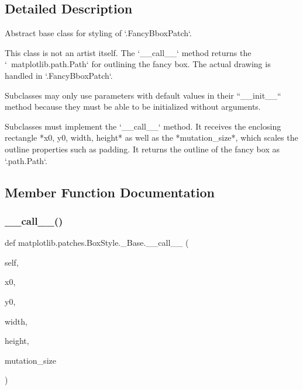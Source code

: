 \subsection{Detailed Description}
\begin{DoxyVerb}Abstract base class for styling of `.FancyBboxPatch`.

This class is not an artist itself.  The `__call__` method returns the
`~matplotlib.path.Path` for outlining the fancy box. The actual drawing
is handled in `.FancyBboxPatch`.

Subclasses may only use parameters with default values in their
``__init__`` method because they must be able to be initialized
without arguments.

Subclasses must implement the `__call__` method. It receives the
enclosing rectangle *x0, y0, width, height* as well as the
*mutation_size*, which scales the outline properties such as padding.
It returns the outline of the fancy box as `.path.Path`.
\end{DoxyVerb}
 

\subsection{Member Function Documentation}
\mbox{\label{classmatplotlib_1_1patches_1_1BoxStyle_1_1__Base_a2330800b02faf0cbd1f53243a9d69348}} 
\subsubsection{\texorpdfstring{\+\_\+\+\_\+call\+\_\+\+\_\+()}{\_\_call\_\_()}}
{\footnotesize\ttfamily def matplotlib.\+patches.\+Box\+Style.\+\_\+\+Base.\+\_\+\+\_\+call\+\_\+\+\_\+ (\begin{DoxyParamCaption}\item[{}]{self,  }\item[{}]{x0,  }\item[{}]{y0,  }\item[{}]{width,  }\item[{}]{height,  }\item[{}]{mutation\+\_\+size }\end{DoxyParamCaption})}

